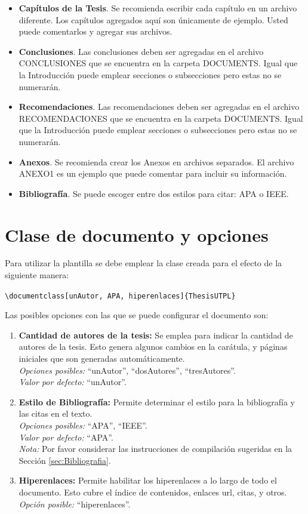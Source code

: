 \begin{itemize}
	\item \textbf{Capítulos de la Tesis}. Se recomienda escribir cada capítulo en un archivo diferente. Los capítulos agregados aquí son únicamente de ejemplo. Usted puede comentarlos y agregar sus archivos.  
	\item \textbf{Conclusiones}. Las conclusiones deben ser agregadas en el archivo CONCLUSIONES que se encuentra en la carpeta DOCUMENTS. Igual que la Introducción puede emplear secciones o subsecciones pero estas no se numerarán.  
	\item \textbf{Recomendaciones}. Las recomendaciones deben ser agregadas en el archivo RECOMENDACIONES que se encuentra en la carpeta DOCUMENTS. Igual que la Introducción puede emplear secciones o subsecciones pero estas no se numerarán.   	
	\item \textbf{Anexos}. Se recomienda crear los Anexos en archivos separados. El archivo ANEXO1 es un ejemplo que puede comentar para incluir su información.  
	\item \textbf{Bibliografía}. Se puede escoger entre dos estilos para citar: APA o IEEE.
\end{itemize}

\section{Clase de documento y opciones}

Para utilizar la plantilla se debe emplear la clase creada para el efecto de la siguiente manera: 

\lstinline|\documentclass[unAutor, APA, hiperenlaces]{ThesisUTPL}| 

Las posibles opciones con las que se puede configurar el documento son: 

\begin{enumerate}
	\item \textbf{Cantidad de autores de la tesis:} Se emplea para indicar la cantidad de autores de la tesis. Esto genera algunos cambios en la carátula, y páginas iniciales que son generadas automáticamente. \\
	\textit{Opciones posibles:} ``unAutor'', ``dosAutores'', ``tresAutores''. \\
	\textit{Valor por defecto:} ``unAutor''.
	\item \textbf{Estilo de Bibliografía:} Permite determinar el estilo para la bibliografía y las citas en el texto. \\
	\textit{Opciones posibles:} ``APA'', ``IEEE''.\\
	\textit{Valor por defecto:} ``APA''. \\
	\textit{Nota:} Por favor considerar las instrucciones de compilación sugeridas en la Sección \ref{sec:Bibliografia}.
	
	\item \textbf{Hiperenlaces:} Permite habilitar los hiperenlaces a lo largo de todo el documento. Esto cubre el índice de contenidos, enlaces url, citas, y otros. \\
	\textit{Opción posible:} ``hiperenlaces''. 
	
\end{enumerate}

